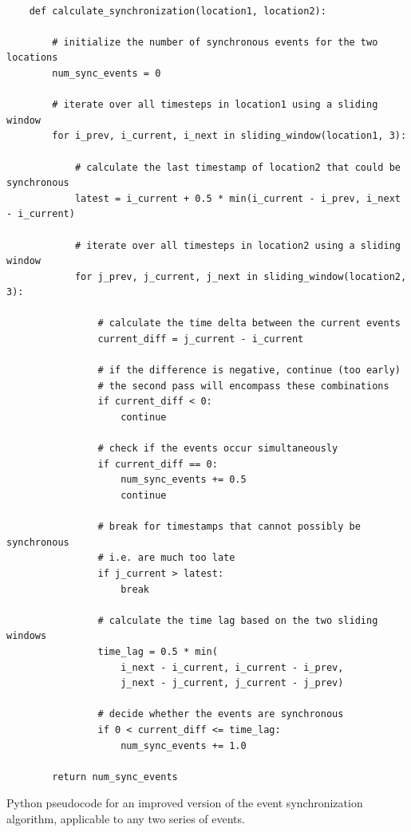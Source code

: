 \begin{listing}[H]
  \begin{verbatim}

    def calculate_synchronization(location1, location2):

        # initialize the number of synchronous events for the two locations
        num_sync_events = 0

        # iterate over all timesteps in location1 using a sliding window
        for i_prev, i_current, i_next in sliding_window(location1, 3):

            # calculate the last timestamp of location2 that could be synchronous
            latest = i_current + 0.5 * min(i_current - i_prev, i_next - i_current)

            # iterate over all timesteps in location2 using a sliding window
            for j_prev, j_current, j_next in sliding_window(location2, 3):

                # calculate the time delta between the current events
                current_diff = j_current - i_current

                # if the difference is negative, continue (too early)
                # the second pass will encompass these combinations
                if current_diff < 0:
                    continue

                # check if the events occur simultaneously
                if current_diff == 0:
                    num_sync_events += 0.5
                    continue

                # break for timestamps that cannot possibly be synchronous
                # i.e. are much too late
                if j_current > latest:
                    break

                # calculate the time lag based on the two sliding windows
                time_lag = 0.5 * min(
                    i_next - i_current, i_current - i_prev,
                    j_next - j_current, j_current - j_prev)

                # decide whether the events are synchronous
                if 0 < current_diff <= time_lag:
                    num_sync_events += 1.0

        return num_sync_events

  \end{verbatim}
  \caption{Python pseudocode for an improved version of the event synchronization algorithm, applicable to any two series of events.}
  \label{lst:event_synchronization_improved}
\end{listing}

